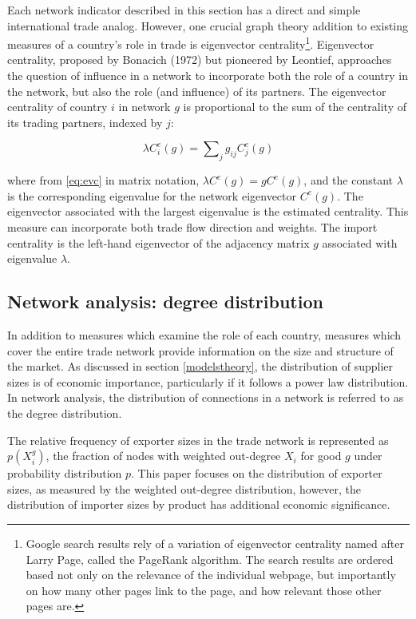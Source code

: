 \documentclass[10pt,letterpaper,pdftex]{article}
\begin{document}
Each network indicator described in this section has a direct and simple international trade analog. However, one crucial graph theory addition to existing measures of a country's role in trade is eigenvector centrality\footnote{Google search results rely of a variation of eigenvector centrality named after Larry Page, called the PageRank algorithm. The search results are ordered based not only on the relevance of the individual webpage, but importantly on how many other pages link to the page, and how relevant those other pages are.}. Eigenvector centrality, proposed by Bonacich (1972) but pioneered by Leontief, approaches the question of influence in a network to incorporate both the role of a country in the network, but also the role (and influence) of its partners. The eigenvector centrality of country $i$ in network $g$ is proportional to the sum of the centrality of its trading partners, indexed by $j$:

\begin{equation}\label{eq:evc}
\lambda C^e_i(g) = \sum\nolimits_{j} g_{ij}C^e_j(g)
\end{equation}

where from \eqref{eq:evc} in matrix notation, $\lambda C^e(g) = gC^e(g)$, and the constant $\lambda$ is the corresponding eigenvalue for the network eigenvector $C^e(g)$. The eigenvector associated with the largest eigenvalue is the estimated centrality. This measure can incorporate both trade flow direction and weights. The import centrality is the left-hand eigenvector of the adjacency matrix $g$ associated with eigenvalue $\lambda$.

\subsection{Network analysis: degree distribution} \label{nw4}
In addition to measures which examine the role of each country, measures which cover the entire trade network provide information on the size and structure of the market. As discussed in section \ref{modelstheory}, the distribution of supplier sizes is of economic importance, particularly if it follows a power law distribution. In network analysis, the distribution of connections in a network is referred to as the degree distribution. 

The relative frequency of exporter sizes in the trade network is represented as $p(X^g_{i})$, the fraction of nodes with weighted out-degree $X_i$ for good $g$ under probability distribution $p$. This paper focuses on the distribution of exporter sizes, as measured by the weighted out-degree distribution, however, the distribution of importer sizes by product has additional economic significance.
\end{document}
